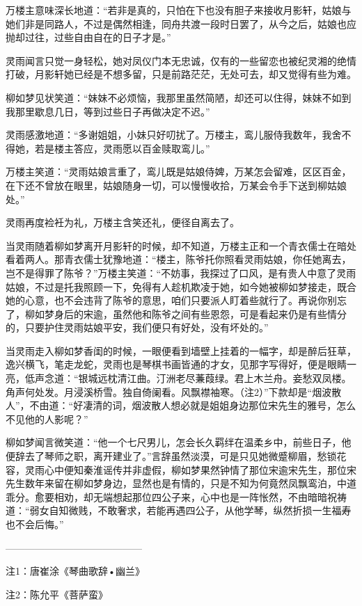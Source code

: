 万楼主意味深长地道：“若非是真的，只怕在下也没有胆子来接收月影轩，姑娘与她们非是同路人，不过是偶然相逢，同舟共渡一段时日罢了，从今之后，姑娘也应抛却过往，过些自由自在的日子才是。”

灵雨闻言只觉一身轻松，她对凤仪门本无忠诚，仅有的一些留恋也被纪灵湘的绝情打破，月影轩她已经是不想多留，只是前路茫茫，无处可去，却又觉得有些为难。

柳如梦见状笑道：“妹妹不必烦恼，我那里虽然简陋，却还可以住得，妹妹不如到我那里歇息几日，等到过些日子再做决定不迟。”

灵雨感激地道：“多谢姐姐，小妹只好叨扰了。万楼主，鸾儿服侍我数年，我舍不得她，若是楼主答应，灵雨愿以百金赎取鸾儿。”

万楼主笑道：“灵雨姑娘言重了，鸾儿既是姑娘侍婢，万某怎会留难，区区百金，在下还不曾放在眼里，姑娘随身一切，可以慢慢收拾，万某会令手下送到柳姑娘处。”

灵雨再度裣衽为礼，万楼主含笑还礼，便径自离去了。

当灵雨随着柳如梦离开月影轩的时候，却不知道，万楼主正和一个青衣儒士在暗处看着两人。那青衣儒士犹豫地道：“楼主，陈爷托你照看灵雨姑娘，你任她离去，岂不是得罪了陈爷？”万楼主笑道：“不妨事，我探过了口风，是有贵人中意了灵雨姑娘，不过是托我照顾一下，免得有人趁机欺凌于她，如今她被柳如梦接走，既合她的心意，也不会违背了陈爷的意思，咱们只要派人盯着些就行了。再说你别忘了，柳如梦身后的宋逾，虽然他和陈爷之间有些恩怨，可是看起来仍是有些情分的，只要护住灵雨姑娘平安，我们便只有好处，没有坏处的。”

当灵雨走入柳如梦香闺的时候，一眼便看到墙壁上挂着的一幅字，却是醉后狂草，逸兴横飞，笔走龙蛇，灵雨也是琴棋书画皆通的才女，见那字写得好，便是眼睛一亮，低声念道：“银城远枕清江曲。汀洲老尽蒹葭绿。君上木兰舟。妾愁双凤楼。角声何处发。月浸溪桥雪。独自倚阑看。风飘襟袖寒。（注2）”下款却是“烟波散人”，不由道：“好凄清的词，烟波散人想必就是姐姐身边那位宋先生的雅号，怎么不见他的人影呢？”

柳如梦闻言微笑道：“他一个七尺男儿，怎会长久羁绊在温柔乡中，前些日子，他便辞去了琴师之职，离开建业了。”言辞虽然淡漠，可是只见她微蹙柳眉，愁锁花容，灵雨心中便知秦淮谣传并非虚假，柳如梦果然钟情了那位宋逾宋先生，那位宋先生数年来留在柳如梦身边，显然也是有情的，只是不知为何竟然凤飘鸾泊，中道乖分。愈要相劝，却无端想起那位四公子来，心中也是一阵怅然，不由暗暗祝祷道：“弱女自知微贱，不敢奢求，若能再遇四公子，从他学琴，纵然折损一生福寿也不会后悔。”

——————————————

注1：唐崔涂《琴曲歌辞•幽兰》

注2：陈允平《菩萨蛮》

